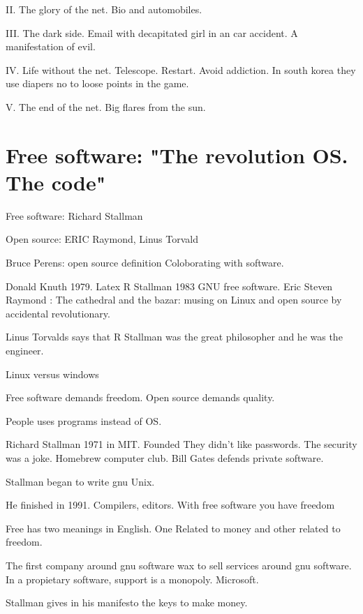     II. The glory of the net. Bio and automobiles. 
    
    III. The dark side. 
    Email with decapitated girl in an car accident. 
    A manifestation of evil. 
    
    IV. Life without the net.  Telescope. 
     Restart. Avoid addiction. 
    In south korea they use diapers no to loose points in the game. 
    
    V. The end of the net. Big flares from the sun. 
    
   
    
   
   
  
  \section{Free software: "The revolution OS. The code"}
  Free software: Richard Stallman 
  
  Open source: ERIC Raymond, Linus Torvald 
  
  
  Bruce Perens: open source definition 
  Coloborating with software. 
  
  Donald Knuth 1979. Latex 
  R Stallman 1983 GNU free software. 
  Eric Steven Raymond : The cathedral and the bazar: musing on Linux and open source by accidental revolutionary. 
  
  Linus Torvalds says that R Stallman was the great philosopher and he was the engineer. 
  
  
  
  
  
  Linux versus windows
  
  
  Free software demands freedom. 
  Open source demands quality. 
  
  People uses programs instead of OS. 
  
  Richard Stallman 
  1971 in MIT. Founded 
  They didn't like passwords. 
  The security was a joke. 
  Homebrew computer club. 
  Bill Gates defends private software. 
  
  Stallman  began to write gnu Unix. 
  
  He finished in 1991. 
  Compilers, editors. 
  With free software you have freedom 
  
  Free has two meanings in English. One 
  Related to money and other related to freedom. 
  
  
  The first company around gnu software wax to sell services around gnu software. In a propietary software, support is a monopoly. Microsoft. 
  
  
  Stallman gives in his manifesto the keys to make money. 
  
